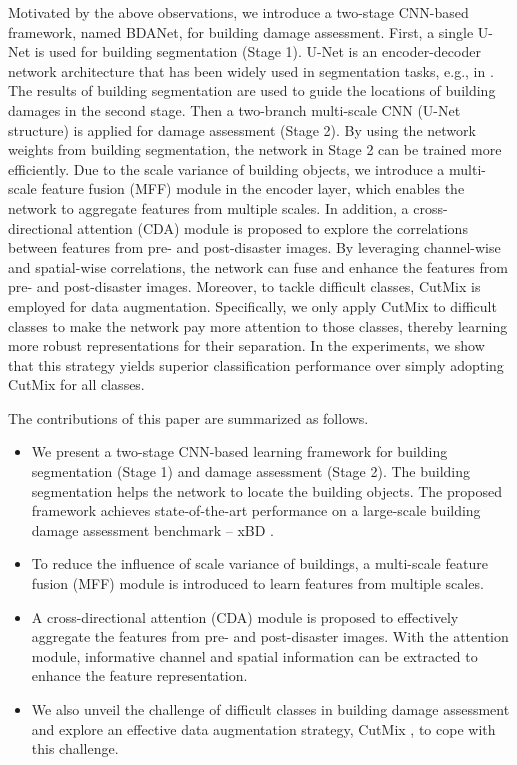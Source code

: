 \documentclass[journal]{IEEEtran}
\begin{document}
Motivated by the above observations, we introduce a two-stage CNN-based framework, named BDANet,  for building damage assessment. First, a single U-Net \cite{UNet} is used for building segmentation (Stage 1). U-Net is an encoder-decoder network architecture that has been widely used in segmentation tasks, e.g., in \cite{liuMultiscaleUShapedCNN2020}. 
The results of building segmentation are used to guide the locations of building damages in the second stage.
Then a two-branch multi-scale CNN (U-Net structure) is applied for damage assessment (Stage 2). By using the network weights from building segmentation, the network in Stage 2 can be trained more efficiently. Due to the scale variance of building objects, we introduce a multi-scale feature fusion (MFF) module in the encoder layer, which enables the network to aggregate features from multiple scales. In addition, a cross-directional attention (CDA) module is proposed to explore the correlations between features from pre- and post-disaster images. By leveraging channel-wise and spatial-wise correlations, the network can fuse and enhance the features from pre- and post-disaster images. Moreover, to tackle difficult classes, CutMix is employed for data augmentation. 
Specifically, we only apply CutMix to difficult classes to make the network pay more attention to those classes, thereby learning more robust representations for their separation. In the experiments, we show that this strategy yields superior classification performance over simply adopting CutMix for all classes. 

The contributions of this paper are summarized as follows.
\begin{itemize}
\item We present a two-stage CNN-based learning framework for building segmentation (Stage 1) and damage assessment (Stage 2). The building segmentation helps the network to locate the building objects. The proposed framework achieves state-of-the-art performance on a large-scale building damage assessment benchmark -- xBD \cite{gupta2019xbd}.

\item To reduce the influence of  scale variance of buildings, a multi-scale feature fusion (MFF) module is introduced to learn features from multiple scales.

\item A cross-directional attention (CDA) module is proposed to effectively aggregate the features from pre- and post-disaster images. With the attention module, informative channel and spatial information can be extracted to enhance the feature representation.

\item We also unveil the challenge of difficult classes in building damage assessment and explore an effective data augmentation strategy, CutMix \cite{yun2019cutmix}, to cope with this challenge. 

\end{itemize}
\end{document}
